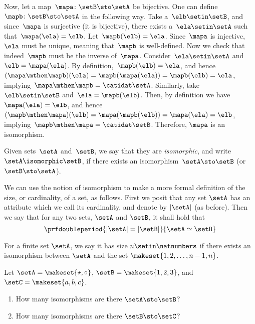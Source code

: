 \begin{solution}
    Now, let a map~$\mapa\colon \setB \sto \setA$ be bijective.
    One can define~$\mapb\colon \setB \sto \setA$ in the following way.
    Take a~$\elb\setin\setB$, and since~$\mapa$ is surjective (it is bijective), there exists a~$\ela\setin\setA$ such that~$\mapa(\ela)=\elb$.
    Let~$\mapb(\elb)=\ela$.
    Since~$\mapa$ is injective,~$\ela$ must be unique, meaning that~$\mapb$ is well-defined.
    Now we check that indeed~$\mapb$ must be the inverse of~$\mapa$.
    Consider~$\ela \setin\setA$ and~$\elb=\mapa(\ela)$.
    By definition,~$\mapb(\elb)=\ela$, and hence~$(\mapa\mthen \mapb)(\ela)=\mapb(\mapa(\ela))=\mapb(\elb)=\ela$, implying~$\mapa\mthen \mapb=\catidat\setA$.
    Similarly, take~$\elb\setin\setB$ and~$\ela=\mapb(\elb)$.
    Then, by definition we have~$\mapa(\ela)=\elb$, and hence~$(\mapb\mthen \mapa)(\elb)=\mapa(\mapb(\elb))=\mapa(\ela)=\elb$, implying~$\mapb\mthen \mapa=\catidat\setB$.
    Therefore, $\mapa$ is an isomorphism.
\end{solution}

\begin{ctdefinition}
    Given sets~$\setA$ and~$\setB$, we say that they are \emph{isomorphic}, and write~$\setA \isomorphic \setB$,
    if there exists an isomorphism~$\setA \sto \setB$ (or~$\setB \sto \setA$).
\end{ctdefinition}

We can use the notion of isomorphism to make a more formal definition of the size, or cardinality, of a set, as follows.
First we posit that any set $\setA$ has an attribute which we call its cardinality, and denote by $\vert \setA \vert$ (as before).
Then we say that for any two sets, $\setA$ and $\setB$, it shall hold that
\begin{equation}
    \prfdoubleperiod{ \vert \setA \vert = \vert \setB \vert }{ \setA \simeq \setB }
\end{equation}

For a finite set $\setA$, we say it has size $n \setin \natnumbers$ if there exists an isomorphism between $\setA$ and the set $\makeset{1,2, \dots, n-1, n}$.

\begin{gradedexercise}
    \label{ex:CountingIsos}

    Let $\setA = \makeset{\star, \circ }$, $\setB = \makeset{1, 2, 3}$, and $\setC = \makeset{a, b, c}$.
    \begin{enumerate}
        \item How many isomorphisms are there $\setA \sto \setB$?
        \item How many isomorphisms are there $\setB \sto \setC$?
    \end{enumerate}
\end{gradedexercise}

